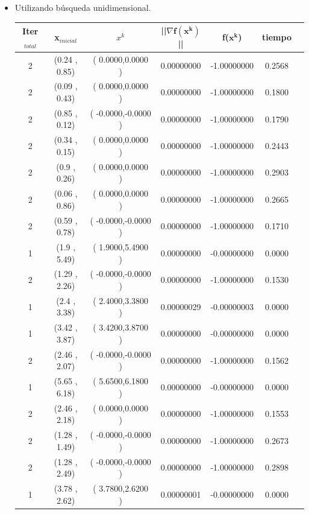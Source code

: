     \begin{itemize}
        \item Utilizando búsqueda unidimensional.

\begin{table}[H]
\centering
\renewcommand{\arraystretch}{1.2} %
\begin{tabular}{|c|c|c|c|c|c|c|}
\hline
\textbf{Iter$_{total}$} &\textbf{x$_{inicial}$} & \textbf{$x^k$} & \textbf{||$\nabla \mathbf{f(x^k)}$}|| & \textbf{f($\mathbf{x^k}$)} &  \textbf{tiempo} \\
\hline
2  &  (0.24 , 0.85) &( 0.0000,0.0000 ) & 0.00000000 & -1.00000000 & 0.2568 \\
2  &  (0.09 , 0.43) &( 0.0000,0.0000 ) & 0.00000000 & -1.00000000 & 0.1800 \\
2  &  (0.85 , 0.12) &( -0.0000,-0.0000 ) & 0.00000000 & -1.00000000 & 0.1790 \\
2  &  (0.34 , 0.15) &( 0.0000,0.0000 ) & 0.00000000 & -1.00000000 & 0.2443 \\
2  &  (0.9 , 0.26) &( 0.0000,0.0000 ) & 0.00000000 & -1.00000000 & 0.2903 \\
2  &  (0.06 , 0.86) &( 0.0000,0.0000 ) & 0.00000000 & -1.00000000 & 0.2665 \\
2  &  (0.59 , 0.78) &( -0.0000,-0.0000 ) & 0.00000000 & -1.00000000 & 0.1710 \\
1  &  (1.9 , 5.49) &( 1.9000,5.4900 ) & 0.00000000 & -0.00000000 & 0.0000 \\
2  &  (1.29 , 2.26) &( -0.0000,-0.0000 ) & 0.00000000 & -1.00000000 & 0.1530 \\
1  &  (2.4 , 3.38) &( 2.4000,3.3800 ) & 0.00000029 & -0.00000003 & 0.0000 \\
1  &  (3.42 , 3.87) &( 3.4200,3.8700 ) & 0.00000000 & -0.00000000 & 0.0000 \\
2  &  (2.46 , 2.07) &( -0.0000,-0.0000 ) & 0.00000000 & -1.00000000 & 0.1562 \\
1  &  (5.65 , 6.18) &( 5.6500,6.1800 ) & 0.00000000 & -0.00000000 & 0.0000 \\
2  &  (2.46 , 2.18) &( 0.0000,0.0000 ) & 0.00000000 & -1.00000000 & 0.1553 \\
2  &  (1.28 , 1.49) &( -0.0000,-0.0000 ) & 0.00000000 & -1.00000000 & 0.2673 \\
2  &  (1.28 , 2.49) &( -0.0000,-0.0000 ) & 0.00000000 & -1.00000000 & 0.2898 \\
1  &  (3.78 , 2.62) &( 3.7800,2.6200 ) & 0.00000001 & -0.00000000 & 0.0000 \\


\end{tabular}
\end{table}
\end{itemize}
